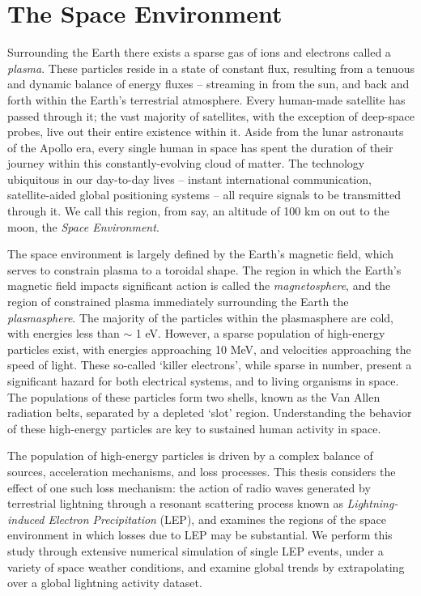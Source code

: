 \section{The Space Environment}
Surrounding the Earth there exists a sparse gas of ions and electrons called a \emph{plasma}. These particles reside in a state of constant flux, resulting from a tenuous and dynamic balance of energy fluxes -- streaming in from the sun, and back and forth within the Earth's terrestrial atmosphere. Every human-made satellite has passed through it; the vast majority of satellites, with the exception of deep-space probes, live out their entire existence within it. Aside from the lunar astronauts of the Apollo era, every single human in space has spent the duration of their journey within this constantly-evolving cloud of matter. The technology ubiquitous in our day-to-day lives -- instant international communication, satellite-aided global positioning systems -- all require signals to be transmitted through it. We call this region, from say, an altitude of 100 km on out to the moon, the \emph{Space Environment}.


The space environment is largely defined by the Earth's magnetic field, which serves to constrain plasma to a toroidal shape. The region in which the Earth's magnetic field impacts significant action is called the \emph{magnetosphere}, and the region of constrained plasma immediately surrounding the Earth the \emph{plasmasphere}. The majority of the particles within the plasmasphere are cold, with energies less than $\sim$ 1 eV. However, a sparse population of high-energy particles exist, with energies approaching 10 MeV, and velocities approaching the speed of light. These so-called `killer electrons', while sparse in number, present a significant hazard for both electrical systems, and to living organisms in space\citep{Barth2003}. The populations of these particles form two shells, known as the Van Allen radiation belts, separated by a depleted `slot' region. Understanding the behavior of these high-energy particles are key to sustained human activity in space. 

The population of high-energy particles is driven by a complex balance of sources, acceleration mechanisms, and loss processes. This thesis considers the effect of one such loss mechanism: the action of radio waves generated by terrestrial lightning through a resonant scattering process known as \emph{Lightning-induced Electron Precipitation} (LEP), and examines the regions of the space environment in which losses due to LEP may be substantial. We perform this study through extensive numerical simulation of single LEP events, under a variety of space weather conditions, and examine global trends by extrapolating over a global lightning activity dataset.

